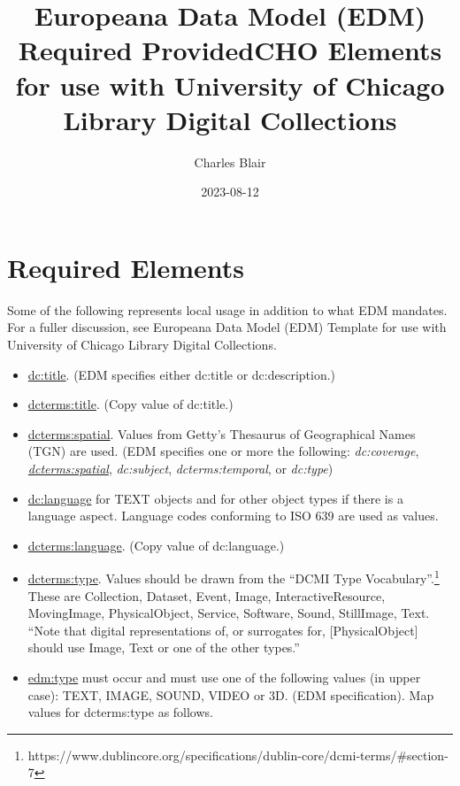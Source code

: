 \documentclass[11pt]{article}
\date{2023-08-12}
\title{Europeana Data Model (EDM) Required ProvidedCHO Elements for use with University of Chicago Library Digital Collections}
\author{Charles Blair}
\begin{document}
\maketitle

\section*{Required Elements}
Some of the following represents local usage in addition to what EDM mandates. For a fuller discussion, see Europeana Data Model (EDM) Template for use with University of Chicago Library Digital Collections.

\begin{itemize}

  \item \underline{dc:title}. (EDM specifies either dc:title or dc:description.)

  \item \underline{dcterms:title}. (Copy value of dc:title.)

  \item \underline{dcterms:spatial}. Values from Getty's Thesaurus of Geographical Names (TGN) are used. (EDM specifies one or more the following: \textit{dc:coverage}, \underline{\textit{dcterms:spatial}}, \textit{dc:subject}, \textit{dcterms:temporal}, or \textit{dc:type})

  \item \underline{dc:language} for TEXT objects and for other object types if there is a language aspect. Language codes conforming to ISO 639 are used as values.

  \item \underline{dcterms:language}. (Copy value of dc:language.)

  \item \underline{dcterms:type}. Values should be drawn from the ``DCMI Type Vocabulary''.\footnote{https://www.dublincore.org/specifications/dublin-core/dcmi-terms/\#section-7} These are Collection, Dataset, Event, Image, InteractiveResource, MovingImage, PhysicalObject, Service, Software, Sound, StillImage, Text. ``Note that digital representations of, or surrogates for, [PhysicalObject] should use Image, Text or one of the other types.''

  \item \underline{edm:type} must occur and must use one of the following values (in upper case): TEXT, IMAGE, SOUND, VIDEO or 3D. (EDM specification). Map values for dcterms:type as follows.


\end{itemize}
\end{document}
